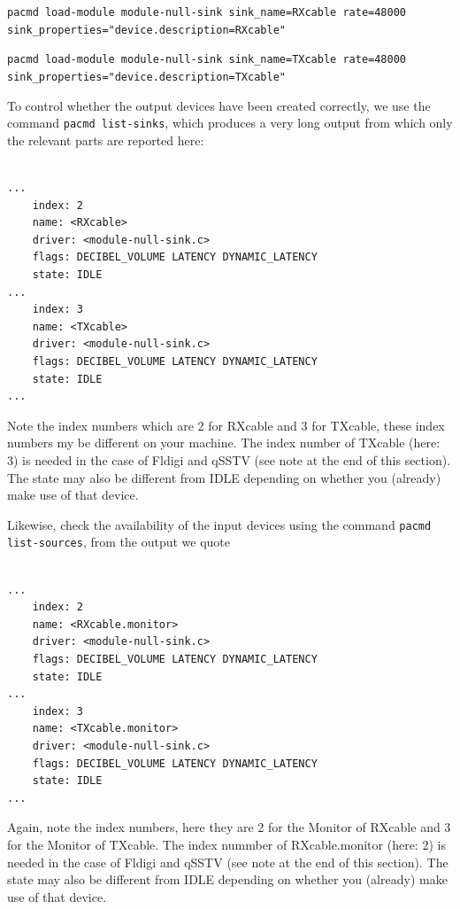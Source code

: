 \documentclass[12pt]{book}
\begin{document}
\texttt{pacmd load-module module-null-sink sink\_name=RXcable rate=48000 \\
sink\_properties="device.description=RXcable"
}

\texttt{pacmd load-module module-null-sink sink\_name=TXcable rate=48000 \\
sink\_properties="device.description=TXcable"
}

To control whether the output devices have been created correctly, we use the command
\texttt{pacmd list-sinks}, which produces
a very long output from which only the relevant parts are reported here:

\begin{small}
\begin{verbatim}

...
    index: 2
	name: <RXcable>
	driver: <module-null-sink.c>
	flags: DECIBEL_VOLUME LATENCY DYNAMIC_LATENCY
	state: IDLE
...
    index: 3
	name: <TXcable>
	driver: <module-null-sink.c>
	flags: DECIBEL_VOLUME LATENCY DYNAMIC_LATENCY
	state: IDLE
...
\end{verbatim}
\end{small}

Note the index numbers which are 2 for RXcable and 3 for TXcable, these index numbers my
be different on your machine. The index number of TXcable (here: 3) is needed in the
case of Fldigi and qSSTV (see note at the end of this section).
The state may also be different from IDLE depending on whether
you (already) make use of that device.

Likewise, check the availability of the input devices using
the command \texttt{pacmd list-sources}, from the output we quote

\begin{small}
\begin{verbatim}

...
    index: 2
	name: <RXcable.monitor>
	driver: <module-null-sink.c>
	flags: DECIBEL_VOLUME LATENCY DYNAMIC_LATENCY
	state: IDLE
...
    index: 3
	name: <TXcable.monitor>
	driver: <module-null-sink.c>
	flags: DECIBEL_VOLUME LATENCY DYNAMIC_LATENCY
	state: IDLE
...
\end{verbatim}
\end{small}

Again, note the index numbers, here they are 2 for the Monitor of RXcable and 3 for the Monitor
of TXcable. The index nummber of RXcable.monitor (here: 2) is needed in the
case of Fldigi and qSSTV (see note at the end of this section).
The state may also be different from IDLE depending on whether
you (already) make use of that device.
\end{document}
